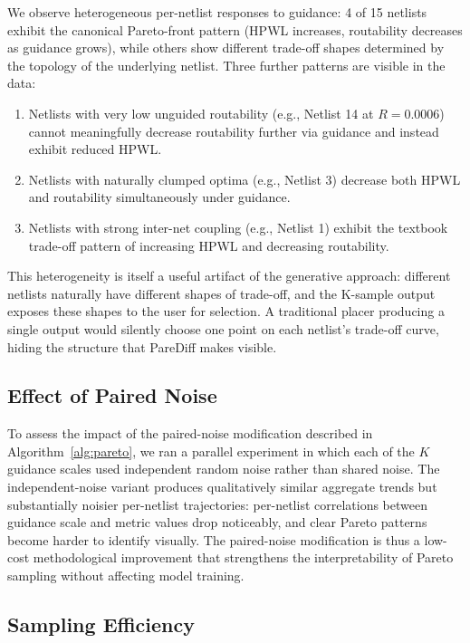 \documentclass[lettersize,journal]{IEEEtran}
\begin{document}
We observe heterogeneous per-netlist responses to guidance: 4 of 15 netlists exhibit the canonical Pareto-front pattern (HPWL increases, routability decreases as guidance grows), while others show different trade-off shapes determined by the topology of the underlying netlist. Three further patterns are visible in the data:
\begin{enumerate}
\item Netlists with very low unguided routability (e.g., Netlist 14 at $R = 0.0006$) cannot meaningfully decrease routability further via guidance and instead exhibit reduced HPWL.
\item Netlists with naturally clumped optima (e.g., Netlist 3) decrease both HPWL and routability simultaneously under guidance.
\item Netlists with strong inter-net coupling (e.g., Netlist 1) exhibit the textbook trade-off pattern of increasing HPWL and decreasing routability.
\end{enumerate}

This heterogeneity is itself a useful artifact of the generative approach: different netlists naturally have different shapes of trade-off, and the K-sample output exposes these shapes to the user for selection. A traditional placer producing a single output would silently choose one point on each netlist's trade-off curve, hiding the structure that PareDiff makes visible.

\subsection{Effect of Paired Noise}

To assess the impact of the paired-noise modification described in Algorithm~\ref{alg:pareto}, we ran a parallel experiment in which each of the $K$ guidance scales used independent random noise rather than shared noise. The independent-noise variant produces qualitatively similar aggregate trends but substantially noisier per-netlist trajectories: per-netlist correlations between guidance scale and metric values drop noticeably, and clear Pareto patterns become harder to identify visually. The paired-noise modification is thus a low-cost methodological improvement that strengthens the interpretability of Pareto sampling without affecting model training.

\subsection{Sampling Efficiency}
\end{document}
